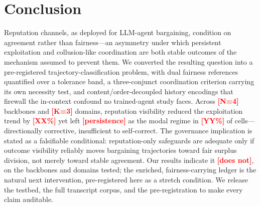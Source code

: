 \documentclass[conference]{IEEEtran}
\newcommand{\ph}[1]{\textcolor{red}{\textbf{[#1]}}}
\begin{document}
\section{Conclusion}\label{sec:conclusion}

Reputation channels, as deployed for LLM-agent bargaining, condition on
agreement rather than fairness---an asymmetry under which persistent
exploitation and collusion-like coordination are both stable outcomes of the
mechanism assumed to prevent them. We converted the resulting question into a
pre-registered trajectory-classification problem, with dual fairness
references quantified over a tolerance band, a three-conjunct coordination
criterion carrying its own necessity test, and content/order-decoupled
history encodings that firewall the in-context confound no trained-agent
study faces. Across \ph{N=4} backbones and \ph{K=3} domains, reputation
visibility reduced the exploitation trend by \ph{XX\%} yet left
\ph{persistence} as the modal regime in \ph{YY\%} of cells---directionally
corrective, insufficient to self-correct. The governance implication is
stated as a falsifiable conditional: reputation-only safeguards are adequate
only if outcome visibility reliably moves bargaining trajectories toward fair
surplus division, not merely toward stable agreement. Our results indicate it
\ph{does not}, on the backbones and domains tested; the enriched,
fairness-carrying ledger is the natural next intervention, pre-registered
here as a stretch condition. We release the testbed, the full transcript
corpus, and the pre-registration to make every claim auditable.

\balance


\end{document}
